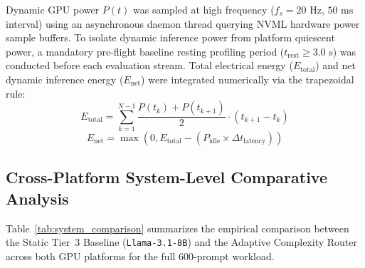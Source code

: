 Dynamic GPU power $P(t)$ was sampled at high frequency ($f_s = 20\text{ Hz}$, $50\text{ ms}$ interval) using an asynchronous daemon thread querying NVML hardware power sample buffers. To isolate dynamic inference power from platform quiescent power, a mandatory pre-flight baseline resting profiling period ($t_{\text{rest}} \ge 3.0\text{ s}$) was conducted before each evaluation stream. Total electrical energy ($E_{\text{total}}$) and net dynamic inference energy ($E_{\text{net}}$) were integrated numerically via the trapezoidal rule:
\begin{equation}
E_{\text{total}} = \sum_{k=1}^{N-1} \frac{P(t_k) + P(t_{k+1})}{2} \cdot (t_{k+1} - t_k)
\end{equation}
\begin{equation}
E_{\text{net}} = \max\left(0, E_{\text{total}} - (P_{\text{idle}} \times \Delta t_{\text{latency}})\right)
\end{equation}

\subsection{Cross-Platform System-Level Comparative Analysis}
\label{subsec:system_results}

Table~\ref{tab:system_comparison} summarizes the empirical comparison between the Static Tier~3 Baseline (\texttt{Llama-3.1-8B}) and the Adaptive Complexity Router across both GPU platforms for the full 600-prompt workload.

